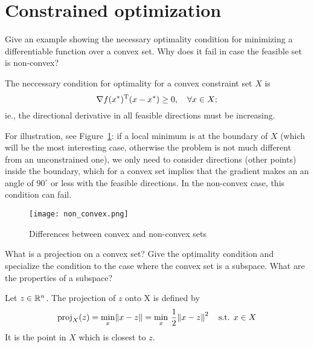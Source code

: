\documentclass{article}
\begin{document}
\section{Constrained optimization}

\begin{question}
  Give an example showing the necessary optimality condition for minimizing a differentiable
  function over a convex set. Why does it fail in case the feasible set is non-convex?
\end{question}

The neccessary condition for optimality for a convex constraint set \(X\) is
\begin{equation*}
  \nabla f(x^*)^{\mathrm{T}}(x - x^*) \geq 0, \quad\forall x \in X;
\end{equation*}
ie., the directional derivative in all feasible directions must be increasing.

For illustration, see Figure~\ref{fig:non-convex}: if a local minimum is at the boundary of \(X\) (which
will be the most interesting case, otherwise the problem is not much different from an unconstrained
one), we only need to consider directions (other points) inside the boundary, which for a convex set
implies that the gradient makes an an angle of \(90^\circ\) or less with the feasible directions.
In the non-convex case, this condition can fail.

\begin{figure}[H]
  \centering
  \texttt{[image: non\_convex.png]}
  \caption{Differences between convex and non-convex sets\label{fig:non-convex}}
\end{figure}

\begin{question}
  What is a projection on a convex set? Give the optimality condition and specialize the condition
  to the case where the convex set is a subspace.  What are the properties of a subspace?
\end{question}

Let \(z \in \mathbb{R}^n\).  The projection of \(z\) onto X is defined by
\begin{equation*}
  \proj_X(z) = \min_x \enVert{x - z}
  = \min_{x}\, \frac{1}{2}\enVert{x - z}^2 \quad\text{s.t. } x \in X
\end{equation*}
It is the point in \(X\) which is closest to \(z\). 
\end{document}
